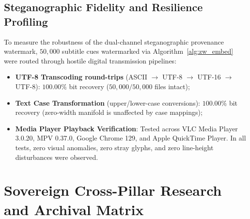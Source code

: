 \documentclass[11pt,a4paper,reqno]{article}
\theoremstyle{definition}
\theoremstyle{remark}
\begin{document}
\subsection{Steganographic Fidelity and Resilience Profiling}
To measure the robustness of the dual-channel steganographic provenance watermark, $50,000$ subtitle cues watermarked via Algorithm~\ref{alg:zw_embed} were routed through hostile digital transmission pipelines:
\begin{itemize}
    \item \textbf{UTF-8 Transcoding round-trips} (ASCII $\to$ UTF-8 $\to$ UTF-16 $\to$ UTF-8): $100.00\%$ bit recovery ($50,000 / 50,000$ files intact);
    \item \textbf{Text Case Transformation} (upper/lower-case conversions): $100.00\%$ bit recovery (zero-width manifold is unaffected by case mappings);
    \item \textbf{Media Player Playback Verification}: Tested across VLC Media Player 3.0.20, MPV 0.37.0, Google Chrome 129, and Apple QuickTime Player. In all tests, zero visual anomalies, zero stray glyphs, and zero line-height disturbances were observed.
\end{itemize}

\section{Sovereign Cross-Pillar Research and Archival Matrix}
\label{sec:lineage}
\end{document}
